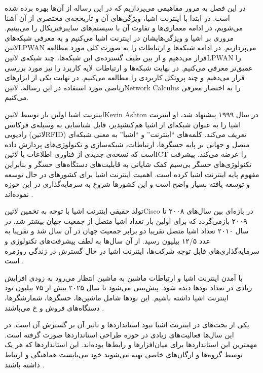 
در این فصل به مرور مفاهیمی می‌پردازیم که در این رساله از آن‌ها بهره برده شده است. در ابتدا با اینترنت اشیا، ویژگی‌های آن و تاریخچه‌ی مختصری از آن آشنا می‌شویم،
در ادامه معماری‌ها و تفاوت آن با سیستم‌های سایبرفیزیکال را می‌بینیم. مروری بر اشیا و ویژگی‌هایشان در اینترنت اشیا می‌کنیم و به معرفی شبکه‌های ‌لاتین{LPWAN}
می‌پردازیم. در ادامه شبکه‌ها و ارتباطات را به صورت کلی مورد مطالعه قرار می‌دهیم و از بین طیف گسترده‌ی این شبکه‌ها، چند شبکه‌ی ‌لاتین{LPWAN} را عمیق‌تر
معرفی می‌کنیم. در نهایت شبکه‌ها و ارتباطات لایه کاربرد را نیز مورد بررسی قرار می‌دهیم و چند پروتکل کاربردی را مطالعه می‌کنیم. در نهایت یکی از ابزارهای ریاضی
مورد استفاده در این رساله، ‌لاتین{Network Calculus} را به اختصار معرفی می‌کنیم.


اینترنت اشیا اولین بار توسط ‌لاتین{Kevin Ashton} در سال ۱۹۹۹ پیشنهاد شد، او اینترنت اشیا را به عنوان
شبکه‌ای از اشیا هم‌کنشپذیر، قابل شناسایی به وسیله‌ی فرکانس رادیویی (‌لاتین{RFID}) تعریف می‌کند.
کلمه‌های ``اینترنت'' و ``اشیا'' به معنی شبکه‌ای متصل و جهانی بر پایه حسگرها، ارتباطات، شبکه‌سازی و تکنولوژی‌های پردازش داده است
که نسخه‌ی جدیدی از فناوری اطلاعات یا ‌لاتین{ICT} را عرضه می‌کند.
پیشرفت تکنولوژی‌های حسگر بی‌سیم کمک شایانی به قابلیت‌های دستگاه‌های حسگر و بنابراین مفهوم پایه اینترنت اشیا کرده است.
اهمیت اینترنت اشیا برای کشورهای در حال توسعه و توسعه یافته بسیار واضح است و این کشورها شروع به سرمایه‌گذاری در این حوزه نموده‌اند
.

تولد حقیقی اینترنت اشیا با توجه به تخمین ‌لاتین{Cisco} در بازه‌ای بین سال‌های ۲۰۰۸ تا ۲۰۰۹ بازمی‌گردد که برای اولین بار تعداد اشیا
متصل از جمعیت جهان بیشتر شد. در سال ۲۰۱۰ تعداد اشیا متصل تقریبا دو برابر جمعیت جهان در آن سال شد و تقریبا به عدد ۱۲/۵ بیلیون رسید.
از آن سال‌ها به لطف پیشرفت‌های تکنولوژی و سرمایه‌گذاری‌های قابل توجه شرکت‌ها، اینترنت اشیا در حال گسترش در زندگی روزمره است
.

با آمدن اینترنت اشیا و ارتباطات ماشین به ماشین انتظار می‌رود به زودی افزایش زیادی در تعداد نودها دیده شود. پیش‌بینی می‌شود تا سال ۲۰۲۵ بیش از ۷۵ بیلیون نود اینترنت اشیا داشته باشیم.
این نودها شامل ماشین‌ها، حسگرها، شمارشگرها، دستگاه‌های فروش و ‌خ می‌باشند .

یکی از بحث‌های در اینترنت اشیا نبود استانداردها و تاثیر آن بر گسترش آن است. در این سال‌ها فعالیت‌های زیادی در حوزه طراحی استانداردها
صورت گرفته است. مهمترین این استانداردها برای میان‌افزارها و رابط‌ها بوده‌اند. این استانداردها که هر یک توسط گروه‌ها و ارگان‌های خاصی تهیه می‌شوند
خود می‌بایست هماهنگی و ارتباط داشته باشند
.

